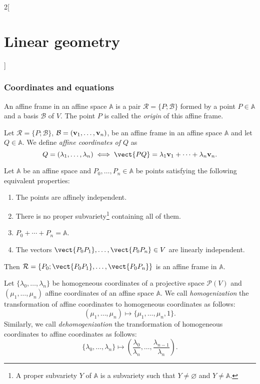 \documentclass[../../../main.tex]{subfiles}
\begin{document}
\begin{multicols}{2}[\section{Linear geometry}]
    \subsubsection*{Coordinates and equations}
    \begin{definition}
        An affine frame in an affine space $\mathbb{A}$ is a pair $\mathcal{R}=\{P;\mathcal{B}\}$ formed by a point $P\in\mathbb{A}$ and a basis $\mathcal{B}$ of $V$. The point $P$ is called the \textit{origin} of this affine frame.
    \end{definition}
    \begin{definition}
        Let $\mathcal{R}=\{P;\mathcal{B}\}$, $\mathcal{B}=(\boldsymbol{\mathrm{v}}_1,\ldots,\boldsymbol{\mathrm{v}}_n)$, be an affine frame in an affine space $\mathbb{A}$ and let $Q\in\mathbb{A}$. We define \textit{affine coordinates of $Q$} as $$Q=(\lambda_1,\ldots,\lambda_n)\iff\vect{PQ}=\lambda_1\vectorfunction{v}_1+\cdots+\lambda_n\vectorfunction{v}_n.$$
    \end{definition}
    \begin{prop}
        Let $\mathbb{A}$ be an affine space and $P_0,\ldots,P_n\in\mathbb{A}$ be points satisfying the following equivalent properties:
        \begin{enumerate}
            \item The points are affinely independent.
            \item There is no proper subvariety\footnote{A proper subvariety $Y$ of $\mathbb{A}$ is a subvariety such that $Y\ne\varnothing$ and  $Y\ne\mathbb{A}$.} containing all of them.
            \item $P_0+\cdots+P_n=\mathbb{A}$.
            \item The vectors $\vect{P_0P_1},\ldots,\vect{P_0P_n}\in V$ are linearly independent.
        \end{enumerate}
        Then $\mathcal{R}=\{P_0;\vect{P_0P_1},\ldots,\vect{P_0P_n}\}$ is an affine frame in $\mathbb{A}$.
    \end{prop}
    \begin{definition}
        Let $\{\lambda_0,\ldots,\lambda_n\}$ be homogeneous coordinates of a projective space $\mathcal{P}(V)$ and $(\mu_1,\ldots,\mu_n)$ affine coordinates of an affine space $\mathbb{A}$. We call \textit{homogenization} the transformation of affine coordinates to homogeneous coordinates as follows: $$(\mu_1,\ldots,\mu_n)\longmapsto\{\mu_1,\ldots,\mu_n,1\}.$$ Similarly, we call \textit{dehomogenization} the transformation of homogeneous coordinates to affine coordinates as follows: $$\{\lambda_0,\ldots,\lambda_n\}\longmapsto\left(\frac{\lambda_0}{\lambda_n},\ldots,\frac{\lambda_{n-1}}{\lambda_n}\right).$$

\end{definition}
\end{multicols}
\end{document}
